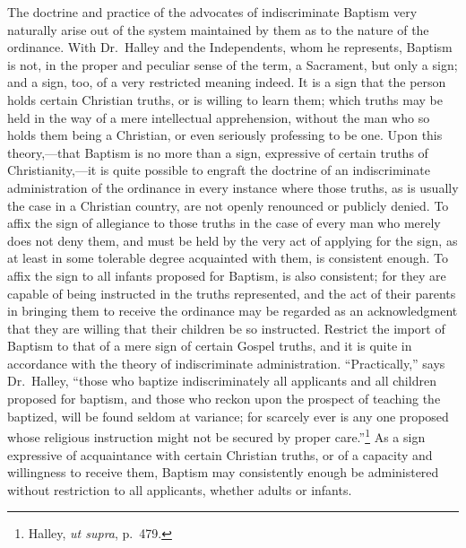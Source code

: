 \documentclass[english,]{book}
\begin{document}
The doctrine and practice of the advocates of indiscriminate Baptism very naturally arise out of the system maintained by them as to the nature of the ordinance. With Dr.~Halley and the Independents, whom he represents, Baptism is not, in the proper and peculiar sense of the term, a Sacrament, but only a sign; and a sign, too, of a very restricted meaning indeed. It is a sign that the person holds certain Christian truths, or is willing to learn them; which truths may be held in the way of a mere intellectual apprehension, without the man who so holds them being a Christian, or even seriously professing to be one. Upon this theory,---that Baptism is no more than a sign, expressive of certain truths of Christianity,---it is quite possible to engraft the doctrine of an indiscriminate administration of the ordinance in every instance where those truths, as is usually the case in a Christian country, are not openly renounced or publicly denied. To affix the sign of allegiance to those truths in the case of every man who merely does not deny them, and must be held by the very act of applying for the sign, as at least in some tolerable degree acquainted with them, is consistent enough. To affix the sign to all infants proposed for Baptism, is also consistent; for they are capable of being instructed in the truths represented, and the act of their parents in bringing them to receive the ordinance may be regarded as an acknowledgment that they are willing that their children be so instructed. Restrict the import of Baptism to that of a mere sign of certain Gospel truths, and it is quite in accordance with the theory of indiscriminate administration. ``Practically,'' says Dr.~Halley, ``those who baptize indiscriminately all applicants and all children proposed for baptism, and those who reckon upon the prospect of teaching the baptized, will be found seldom at variance; for scarcely ever is any one proposed whose religious instruction might not be secured by proper care.''\footnote{Halley, \emph{ut supra}, p.~479.} As a sign expressive of acquaintance with certain Christian truths, or of a capacity and willingness to receive them, Baptism may consistently enough be administered without restriction to all applicants, whether adults or infants.
\end{document}
